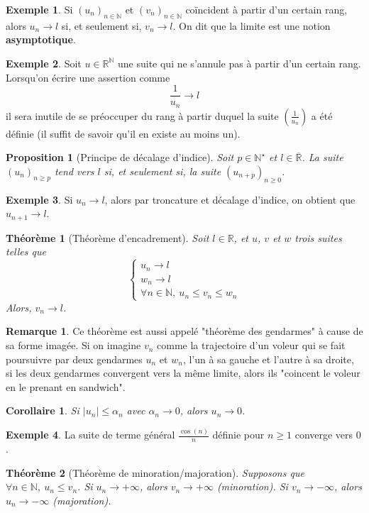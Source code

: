 \documentclass[french]{book}
\newcommand{\N}{\mathbb{N}}
\newcommand{\R}{\mathbb{R}}
\newcommand{\st}{^\star}
\theoremstyle{plain}
\newtheorem{thm}{Théorème}[chapter]
\newtheorem{prop}{Proposition}[chapter]
\newtheorem{cor}{Corollaire}[chapter]
\theoremstyle{definition}
\newtheorem{exa}{Exemple}[chapter]
\newtheorem{rmq}{Remarque}[chapter]
\theoremstyle{remark}
\begin{document}
\begin{exa}
	Si $(u_n)_{n\in\N}$ et $(v_n)_{n\in\N}$ coïncident à partir d'un certain rang, alors $u_n\rightarrow l$ si, et seulement si, $v_n\rightarrow l$. On dit que la limite est une notion \textbf{asymptotique}.
\end{exa}
\begin{exa}
	Soit $u\in\R^\N$ une suite qui ne s'annule pas à partir d'un certain rang. Lorsqu'on écrire une assertion comme $$\frac{1}{u_n}\rightarrow l$$ il sera inutile de se préoccuper du rang à partir duquel la suite $\displaystyle\left(\frac{1}{u_n}\right)$ a été définie (il suffit de savoir qu'il en existe au moins un).
\end{exa}
\begin{prop}[Principe de décalage d'indice]
	Soit $p\in\N\st$ et $l\in\overline{\R}$. La suite $(u_n)_{n\geqslant p}$ tend vers $l$ si, et seulement si, la suite $(u_{n+p})_{n\geqslant0}$.
\end{prop}
\begin{exa}
	Si $u_n\rightarrow l$, alors par troncature et décalage d'indice, on obtient que $u_{n+1}\rightarrow l$.
\end{exa}
\begin{thm}[Théorème d'encadrement]
	Soit $l\in\R$, et $u$, $v$ et $w$ trois suites telles que $$\left \{\begin{array}{lll}u_n\rightarrow l\\ w_n\rightarrow l \\ \forall n\in\N,\ u_n\leqslant v_n\leqslant w_n\end{array}\right.$$ Alors, $v_n\rightarrow l$.
\end{thm}
\begin{rmq}
	Ce théorème est aussi appelé "théorème des gendarmes" à cause de sa forme imagée. Si on imagine $v_n$ comme la trajectoire d'un voleur qui se fait poursuivre par deux gendarmes $u_n$ et $w_n$, l'un à sa gauche et l'autre à sa droite, si les deux gendarmes convergent vers la même limite, alors ils "coincent le voleur en le prenant en sandwich".
\end{rmq}
\begin{cor}
	Si $\lvert u_n\rvert\leqslant\alpha_n$ avec $\alpha_n\rightarrow0$, alors $u_n\rightarrow0$.
\end{cor}
\begin{exa}
	La suite de terme général $\displaystyle\frac{\cos(n)}{n}$ définie pour $n\geqslant1$ converge vers $0$.
\end{exa}
\begin{thm}[Théorème de minoration/majoration]
	Supposons que $\forall n\in\N,\ u_n\leqslant v_n$. Si $u_n\rightarrow+\infty$, alors $v_n\rightarrow+\infty$ (minoration). Si $v_n\rightarrow-\infty$, alors $u_n\rightarrow-\infty$ (majoration).
\end{thm}
\end{document}
